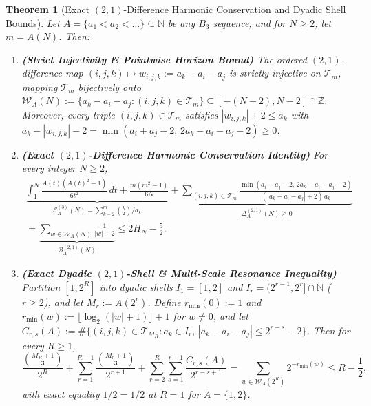 \documentclass[11pt,a4paper]{article}
\newtheorem{theorem}{Theorem}[section]
\theoremstyle{remark}
\begin{document}
\begin{theorem}[Exact $(2,1)$-Difference Harmonic Conservation and Dyadic Shell Bounds]
Let $A = \{a_1 < a_2 < \dots\} \subseteq \mathbb{N}$ be any $B_3$ sequence, and for $N \ge 2$, let $m = A(N)$. Then:
\begin{enumerate}
  \item \textbf{(Strict Injectivity \& Pointwise Horizon Bound)} The ordered $(2,1)$-difference map $(i, j, k) \mapsto w_{i,j,k} := a_k - a_i - a_j$ is strictly injective on $\mathcal{T}_m$, mapping $\mathcal{T}_m$ bijectively onto $\mathcal{W}_A(N) := \{a_k - a_i - a_j : (i,j,k) \in \mathcal{T}_m\} \subseteq [-(N-2), N-2] \cap \mathbb{Z}$. Moreover, every triple $(i,j,k) \in \mathcal{T}_m$ satisfies $|w_{i,j,k}| + 2 \le a_k$ with $a_k - |w_{i,j,k}| - 2 = \min(a_i + a_j - 2,\, 2 a_k - a_i - a_j - 2) \ge 0$.
  \item \textbf{(Exact $(2,1)$-Difference Harmonic Conservation Identity)} For every integer $N \ge 2$,
  \begin{multline*}
    \underbrace{\int_1^N \frac{A(t)(A(t)^2 - 1)}{6 t^2}\,dt + \frac{m(m^2 - 1)}{6 N}}_{\mathcal{E}_A^{(3)}(N) = \sum_{k=2}^m \binom{k}{2}/a_k} + \underbrace{\sum_{(i,j,k) \in \mathcal{T}_m} \frac{\min(a_i + a_j - 2,\, 2 a_k - a_i - a_j - 2)}{(|a_k - a_i - a_j| + 2)\, a_k}}_{\Delta_A^{(2,1)}(N) \ge 0} \\
    = \underbrace{\sum_{w \in \mathcal{W}_A(N)} \frac{1}{|w| + 2}}_{\mathcal{B}_A^{(2,1)}(N)} \le 2 H_N - \frac{5}{2}.
  \end{multline*}
  \item \textbf{(Exact Dyadic $(2,1)$-Shell \& Multi-Scale Resonance Inequality)} Partition $[1, 2^R]$ into dyadic shells $I_1 = [1, 2]$ and $I_r = (2^{r-1}, 2^r] \cap \mathbb{N}$ ($r \ge 2$), and let $M_r := A(2^r)$. Define $r_{\min}(0) := 1$ and $r_{\min}(w) := \lfloor \log_2(|w| + 1) \rfloor + 1$ for $w \ne 0$, and let $C_{r,s}(A) := \#\{(i,j,k) \in \mathcal{T}_{M_R} : a_k \in I_r,\, |a_k - a_i - a_j| \le 2^{r-s} - 2\}$. Then for every $R \ge 1$,
  \[
    \frac{\binom{M_R + 1}{3}}{2^R} + \sum_{r=1}^{R-1} \frac{\binom{M_r + 1}{3}}{2^{r+1}} + \sum_{r=2}^R \sum_{s=1}^{r-1} \frac{C_{r,s}(A)}{2^{r-s+1}} = \sum_{w \in \mathcal{W}_A(2^R)} 2^{-r_{\min}(w)} \le R - \frac{1}{2},
  \]
  with exact equality $1/2 = 1/2$ at $R = 1$ for $A = \{1, 2\}$.
\end{enumerate}
\end{theorem}
\end{document}
